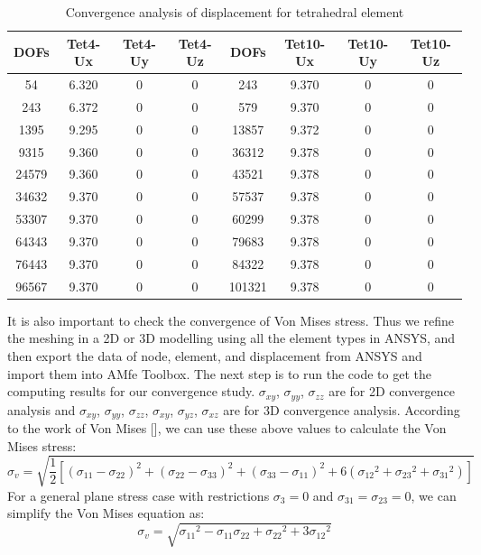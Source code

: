 \begin{table}[ht]
	\caption{Convergence analysis of displacement for tetrahedral element} \label{tab: TetConvergence}
	\begin{tabular}{ c | c | c | c | c | c | c | c} 	
		DOFs & Tet4-Ux & Tet4-Uy & Tet4-Uz & DOFs & Tet10-Ux & Tet10-Uy & Tet10-Uz\\ \hline
		54 & 6.320 & 0 & 0 & 243 & 9.370& 0  & 0 \\ 
		243 & 6.372 & 0 & 0 & 579 & 9.370&0 & 0\\
		1395 & 9.295 & 0 & 0 & 13857 & 9.372&  0 & 0 \\
		9315 & 9.360 &  0 &  0 & 36312&9.378 &0 & 0\\
		24579 & 9.360 &  0 &  0 & 43521 & 9.378&0 & 0\\
		34632 & 9.370 &  0 & 0 &  57537 & 9.378&0 & 0  \\
		53307 & 9.370 &   0 & 0 &  60299 & 9.378&0 & 0 \\
		64343 & 9.370 & 0 &  0 & 79683 & 9.378&0 & 0\\
		76443 & 9.370 & 0 & 0 & 84322 & 9.378 &0 & 0 \\
		96567 & 9.370 & 0 & 0 &  101321 & 9.378& 0& 0\\
		\hline  
	\end{tabular}
\end{table}
It is also important to check the convergence of Von Mises stress. Thus we refine the meshing in a 2D or 3D modelling using all the element types in ANSYS, and then export the data of node, element, and displacement from ANSYS and import them into AMfe Toolbox. The next step is to run the code to get the computing results for our convergence study. $\sigma_{xy}$, $\sigma_{yy}$, $\sigma_{zz}$ are for 2D convergence analysis and $\sigma_{xy}$, $\sigma_{yy}$, $\sigma_{zz}$, $\sigma_{xy}$, $\sigma_{yz}$, $\sigma_{xz}$ are for 3D convergence analysis.  According to the work of Von Mises [\cite{vonMisesR}], we can use these above values to calculate the Von Mises stress: 
\begin{equation}
\sigma_v = \sqrt{\frac{1}{2}\left[\left(\sigma_{11}-\sigma_{22}\right)^2 + \left(\sigma_{22}-\sigma_{33}\right)^2 + \left(\sigma_{33}-\sigma_{11}\right)^2 + 6\left({\sigma_{12}}^2 + {\sigma_{23}}^2 + {\sigma_{31}}^2 \right) \right]}
\end{equation}
For a general plane stress case with restrictions $\sigma_3 = 0$ and $\sigma_{31} = \sigma_{23} = 0$, we can simplify the Von Mises equation as:
\begin{equation}
\sigma_v = \sqrt{{\sigma_{11}}^2 - \sigma_{11}\sigma_{22} + {\sigma_{22}}^2 + 3 {\sigma_{12}}^2}
\end{equation}
